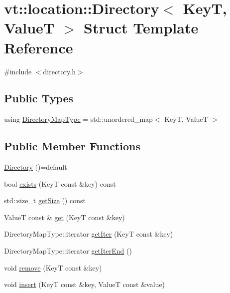 \hypertarget{structvt_1_1location_1_1_directory}{}\section{vt\+:\+:location\+:\+:Directory$<$ KeyT, ValueT $>$ Struct Template Reference}
\label{structvt_1_1location_1_1_directory}


{\ttfamily \#include $<$directory.\+h$>$}

\subsection*{Public Types}
\begin{DoxyCompactItemize}
\item 
using \hyperlink{structvt_1_1location_1_1_directory_a6a897ff3929eccb2d334eb0b87b53f57}{Directory\+Map\+Type} = std\+::unordered\+\_\+map$<$ KeyT, ValueT $>$
\end{DoxyCompactItemize}
\subsection*{Public Member Functions}
\begin{DoxyCompactItemize}
\item 
\hyperlink{structvt_1_1location_1_1_directory_a166cb46d3274d1bc09e4b852d70172af}{Directory} ()=default
\item 
bool \hyperlink{structvt_1_1location_1_1_directory_aec1cbff73a72fb1be6825bd048f69601}{exists} (KeyT const \&key) const
\item 
std\+::size\+\_\+t \hyperlink{structvt_1_1location_1_1_directory_aa5725f97f3444efc18c8745b747545ac}{get\+Size} () const
\item 
ValueT const  \& \hyperlink{structvt_1_1location_1_1_directory_a7d3271252e69fd8c2c16c702b032bdc8}{get} (KeyT const \&key)
\item 
Directory\+Map\+Type\+::iterator \hyperlink{structvt_1_1location_1_1_directory_ae54fc683860dbfd4145012b93332d70c}{get\+Iter} (KeyT const \&key)
\item 
Directory\+Map\+Type\+::iterator \hyperlink{structvt_1_1location_1_1_directory_a7960b610e733ac8df4417a6181e32fe1}{get\+Iter\+End} ()
\item 
void \hyperlink{structvt_1_1location_1_1_directory_a85c59bd87eecbfabcbd7941e1c1929ae}{remove} (KeyT const \&key)
\item 
void \hyperlink{structvt_1_1location_1_1_directory_a9c4f1322988eb75cb7abd13d977b315f}{insert} (KeyT const \&key, ValueT const \&value)
\end{DoxyCompactItemize}
